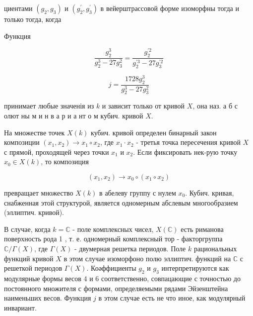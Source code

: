 \documentclass[10pt]{article}
\begin{document}
циентами $\left(g_{2}, g_{3}\right)$ и $\left(g_{2}^{\prime}, g_{3}^{\prime}\right)$ в вейерштрассовой форме изоморфны тогда и только тогда, когда



Функция



\[

\frac{g_{2}^{3}}{g_{2}^{3}-27 g_{3}^{2}}=\frac{g_{2}^{\prime 2}}{g_{2}^{\prime 3}-27 g_{3}^{\prime 2}}

\]



\[

j=\frac{1728 g_{2}^{3}}{g_{2}^{3}-27 g_{3}^{2}}

\]



принимает любые значенія из $k$ и зависит только от кривой $X$, она наз. а б с олют ны м и н в а р и а нт о м кубич. кривой $X$.



На множестве точек $X(k)$ кубич. кривой определен бинарный закон композиции $\left(x_{1}, x_{2}\right) \rightarrow x_{1} \circ x_{2}$, где $x_{1} \cdot x_{2}$ - третья точка пересечения кривой $X$ с прямой, проходящей через точки $x_{1}$ и $x_{2}$. Если фиксировать нек-рую точку $x_{0} \in X(k)$, то композиция



\[

\left(x_{1}, x_{2}\right) \longrightarrow x_{0} \circ\left(x_{1} \circ x_{2}\right)

\]



превращает множество $X(k)$ в абелеву группу с нулем $x_{0}$. Кубич. кривая, снабженная этой структурой, является одномерным абслевым многообразием (эллиптич. кривой).



В случае, когда $k=\mathbb{C}$ - поле комплексных чисел, $X(\mathbb{C})$ есть риманова поверхность рода 1 , т. е. одномерный комплексный тор - факторгруппа $\mathbb{C} / \Gamma(X)$, где $\Gamma(X)$ - двумерная решетка периодов. Поле $k$ рациональных функций кривой $X$ в этом случае изоморфоно полю эллиптич. функций на $\mathbb{C}$ с решеткой периодов $\Gamma(X)$. Коәффициенты $g_{2}$ и $g_{3}$ интерпретируются как модулярные формы весов 4 и 6 соответственно, совпацающие с точностью до постоянного множителя с формами, определяемыми рядами Эйзенштейна наименьших весов. Функция $j$ в этом случае есть не что иное, как модулярный инвариант.
\end{document}
